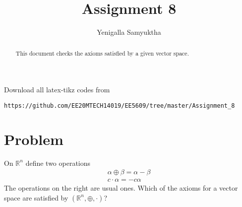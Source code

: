 \documentclass[journal,12pt,twocolumn]{IEEEtran}
\begin{document}
     \def\rightbox#1{\makebox[0in][r]{#1}}
     \def\centbox#1{\makebox[0in]{#1}}
     \def\topbox#1{\raisebox{-\baselineskip}[0in][0in]{#1}}
     \def\midbox#1{\raisebox{-0.5\baselineskip}[0in][0in]{#1}}
\vspace{3cm}
\title{Assignment 8}
\author{Yenigalla Samyuktha}
\maketitle
\newpage
\bigskip
\renewcommand{\thefigure}{\theenumi}
\renewcommand{\thetable}{\theenumi}
\begin{abstract}
This document checks the axioms satisfied by a given vector space.
\end{abstract}
Download all latex-tikz codes from 
%
\begin{lstlisting}
https://github.com/EE20MTECH14019/EE5609/tree/master/Assignment_8
\end{lstlisting}
%
\section{Problem}
On $\mathbb{R}^n$  define two operations
\begin{align}
\alpha\oplus\beta=\alpha-\beta\\
c\cdot\alpha=-c\alpha
\end{align}
The operations on the right are usual ones. Which of the axioms for a vector space are satisfied by $(\mathbb{R}^n,\oplus,\cdot)$?
\end{document}
